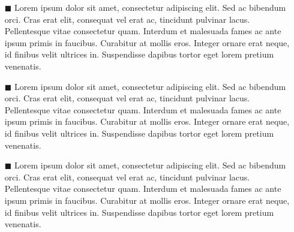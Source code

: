 \documentclass[./main.tex]{subfiles}
\begin{document}
\begin{itemize}
    \item[$\blacksquare$] Lorem ipsum dolor sit amet, consectetur adipiscing elit. Sed ac bibendum orci. Cras erat elit, consequat vel erat ac, tincidunt pulvinar lacus. Pellentesque vitae consectetur quam. Interdum et malesuada fames ac ante ipsum primis in faucibus. Curabitur at mollis eros. Integer ornare erat neque, id finibus velit ultrices in. Suspendisse dapibus tortor eget lorem pretium venenatis.
    \item[$\blacksquare$] Lorem ipsum dolor sit amet, consectetur adipiscing elit. Sed ac bibendum orci. Cras erat elit, consequat vel erat ac, tincidunt pulvinar lacus. Pellentesque vitae consectetur quam. Interdum et malesuada fames ac ante ipsum primis in faucibus. Curabitur at mollis eros. Integer ornare erat neque, id finibus velit ultrices in. Suspendisse dapibus tortor eget lorem pretium venenatis.
    \item[$\blacksquare$] Lorem ipsum dolor sit amet, consectetur adipiscing elit. Sed ac bibendum orci. Cras erat elit, consequat vel erat ac, tincidunt pulvinar lacus. Pellentesque vitae consectetur quam. Interdum et malesuada fames ac ante ipsum primis in faucibus. Curabitur at mollis eros. Integer ornare erat neque, id finibus velit ultrices in. Suspendisse dapibus tortor eget lorem pretium venenatis. 
\end{itemize}
\end{document}
